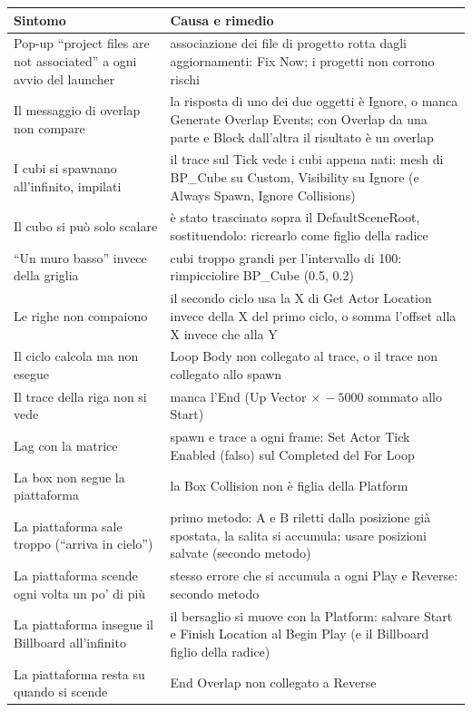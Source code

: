 \begin{table}[htbp]
\centering
\small
\begin{tabular}{@{}p{5.4cm}p{8.6cm}@{}}
\toprule
\textbf{Sintomo} & \textbf{Causa e rimedio} \\
\midrule
Pop-up ``project files are not associated'' a ogni avvio del launcher & associazione
dei file di progetto rotta dagli aggiornamenti: Fix Now; i progetti non corrono rischi \\
Il messaggio di overlap non compare & la risposta di uno dei due oggetti è Ignore, o
manca Generate Overlap Events; con Overlap da una parte e Block dall'altra il risultato
è un overlap \\
I cubi si spawnano all'infinito, impilati & il trace sul Tick vede i cubi appena nati:
mesh di BP\_Cube su Custom, Visibility su Ignore (e Always Spawn, Ignore Collisions) \\
Il cubo si può solo scalare & è stato trascinato sopra il DefaultSceneRoot,
sostituendolo: ricrearlo come figlio della radice \\
``Un muro basso'' invece della griglia & cubi troppo grandi per l'intervallo di 100:
rimpicciolire BP\_Cube (0.5, 0.2) \\
Le righe non compaiono & il secondo ciclo usa la X di Get Actor Location invece della X
del primo ciclo, o somma l'offset alla X invece che alla Y \\
Il ciclo calcola ma non esegue & Loop Body non collegato al trace, o il trace non
collegato allo spawn \\
Il trace della riga non si vede & manca l'End (Up Vector $\times\,-5000$ sommato allo
Start) \\
Lag con la matrice & spawn e trace a ogni frame: Set Actor Tick Enabled (falso) sul
Completed del For Loop \\
La box non segue la piattaforma & la Box Collision non è figlia della Platform \\
La piattaforma sale troppo (``arriva in cielo'') & primo metodo: A e B riletti dalla
posizione già spostata, la salita si accumula; usare posizioni salvate (secondo metodo) \\
La piattaforma scende ogni volta un po' di più & stesso errore che si accumula a ogni
Play e Reverse: secondo metodo \\
La piattaforma insegue il Billboard all'infinito & il bersaglio si muove con la
Platform: salvare Start e Finish Location al Begin Play (e il Billboard figlio della
radice) \\
La piattaforma resta su quando si scende & End Overlap non collegato a Reverse \\

\end{tabular}
\end{table}
